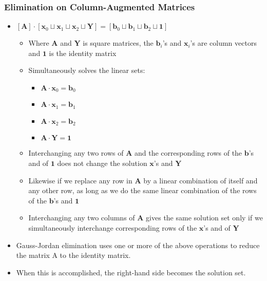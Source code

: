 \documentclass[a4wide,10pt]{article}
\begin{document}
\subsubsection{Elimination on Column-Augmented Matrices} %
\label{ssub:elimination_on_column_augmented_matrices}
\begin{itemize}
	\item $[\mathbf{A}] \cdot [\mathbf{x}_0 \sqcup \mathbf{x}_1 \sqcup \mathbf{x}_2 \sqcup \mathbf{Y}] = [\mathbf{b}_0 \sqcup \mathbf{b}_1 \sqcup \mathbf{b}_2 \sqcup \mathbf{1}]$
	\begin{itemize}
		\item Where $\mathbf{A}$ and $\mathbf{Y}$ is square matrices, the $\mathbf{b}_i$'s and $\mathbf{x}_i$'s are column vectors and $\mathbf{1}$ is the identity matrix
		\item Simultaneously solves the linear sets:
		\begin{itemize}
			\item $\mathbf{A} \cdot \mathbf{x}_0 = \mathbf{b}_0$
			\item $\mathbf{A} \cdot \mathbf{x}_1 = \mathbf{b}_1$
			\item $\mathbf{A} \cdot \mathbf{x}_2 = \mathbf{b}_2$
			\item $\mathbf{A} \cdot \mathbf{Y} = \mathbf{1}$
		\end{itemize}
		\item Interchanging any two rows of $\mathbf{A}$ and the corresponding rows of the $\mathbf{b}$’s and of $\mathbf{1}$ does not change the solution $\mathbf{x}$'s and $\mathbf{Y}$
		\item Likewise if we replace any row in $\mathbf{A}$ by a linear combination of itself and any other row, as long as we do the same linear combination of the rows of the $\mathbf{b}$'s and $\mathbf{1}$
		\item Interchanging any two columns of $\mathbf{A}$ gives the same solution set only if we simultaneously interchange corresponding rows of the $\mathbf{x}$'s and of $\mathbf{Y}$
	\end{itemize}
	\item Gauss-Jordan elimination uses one or more of the above operations to reduce the matrix A to the identity matrix.
	\item When this is accomplished, the right-hand side becomes the solution set.
\end{itemize}

\end{document}
